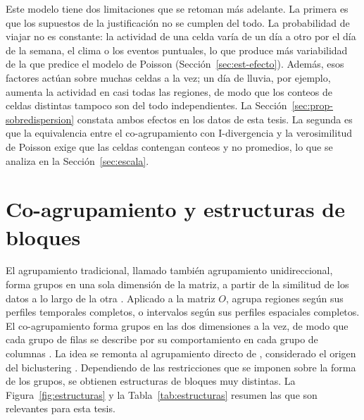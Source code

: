Este modelo tiene dos limitaciones que se retoman más adelante. La primera es que
los supuestos de la justificación no se cumplen del todo. La probabilidad de
viajar no es constante: la actividad de una celda varía de un día a otro por el
día de la semana, el clima o los eventos puntuales, lo que produce más
variabilidad de la que predice el modelo de Poisson
(Sección~\ref{sec:est-efecto}). Además, esos factores actúan sobre muchas celdas
a la vez; un día de lluvia, por ejemplo, aumenta la actividad en casi todas las
regiones, de modo que los conteos de celdas distintas tampoco son del todo
independientes. La Sección~\ref{sec:prop-sobredispersion} constata ambos efectos
en los datos de esta tesis. La segunda es que la equivalencia entre el
co-agrupamiento con I-divergencia y la verosimilitud de Poisson exige que las
celdas contengan conteos y no promedios, lo que se analiza en la
Sección~\ref{sec:escala}.

\section{Co-agrupamiento y estructuras de bloques}\label{sec:estructuras}

El agrupamiento tradicional, llamado también agrupamiento unidireccional, forma
grupos en una sola dimensión de la matriz, a partir de la similitud de los datos a
lo largo de la otra \cite{Wu2020}. Aplicado a la matriz $O$, agrupa regiones según
sus perfiles temporales completos, o intervalos según sus perfiles espaciales
completos. El co-agrupamiento forma grupos en las dos dimensiones a la vez,
de modo que cada grupo de filas se describe por su comportamiento en cada grupo de
columnas \cite{Wu2020}. La idea se remonta al agrupamiento directo de
\cite{Hartigan1972}, considerado el origen del biclustering \cite{Castanho2024}.
Dependiendo de las restricciones que se imponen sobre la forma de los grupos, se
obtienen estructuras de bloques muy distintas. La
Figura~\ref{fig:estructuras} y la Tabla~\ref{tab:estructuras} resumen las que son
relevantes para esta tesis.

